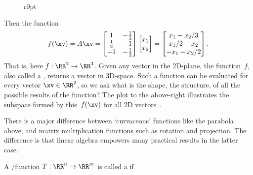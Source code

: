 \begin{wrapfigure}[7]r{0pt}
\end{wrapfigure}
Then the function
\begin{equation*}
f(\xv)=A\xv
=\begin{bmatrix} 1&-\frac13\\\frac12&-1\\-1&-\frac12 \end{bmatrix}\begin{bmatrix} x_1\\x_2 \end{bmatrix}
=\begin{bmatrix} x_1-x_2/3\\x_1/2-x_2\\-x_1-x_2/2 \end{bmatrix}.
\end{equation*}
That is, here \(f:\RR^2\to\RR^3\).  
Given any vector in the 2D-plane, the function~\(f\), also called a , returns a vector in 3D-space.  
Such a function can be evaluated for every vector \(\xv\in\RR^2\), so we ask what is the shape, the structure, of all the possible results of the function?
The plot to the above-right illustrates the subspace formed by this~\(f(\xv)\) for all 2D vectors~\xv.


There is a major difference between `curvaceous' functions like the parabola above, and matrix multiplication functions such as rotation and projection.
The difference is that linear algebra empowers many practical results in the latter case.



\begin{definition} \label{def:lintran} 
A \slash function \(T:\RR^n\to\RR^m\) is called a  if
\end{definition}


